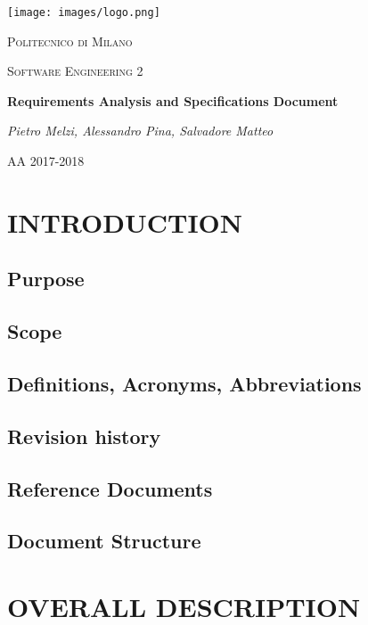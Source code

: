 \documentclass[11pt]{report}
\begin{document}
	\begin{titlepage}
		\centering
		\texttt{[image: images/logo.png]}\par\vspace{1cm}
		{\scshape\LARGE Politecnico di Milano \par}
		\vspace{1cm}
		{\scshape\Large Software Engineering 2\par}
		\vspace{1.5cm}
		{\huge\bfseries Requirements Analysis and Specifications Document\par}
		\vspace{2cm}
		{\Large\itshape Pietro Melzi, Alessandro Pina, Salvadore Matteo\par}

		\vfill

		{\large AA 2017-2018\par}
	\end{titlepage}

	\tableofcontents{}

	\chapter{INTRODUCTION}
		\section{Purpose}
		\section{Scope}
		\section{Definitions, Acronyms, Abbreviations}
		\section{Revision history}
		\section{Reference Documents}
		\section{Document Structure}
	\chapter{OVERALL DESCRIPTION}
\end{document}
